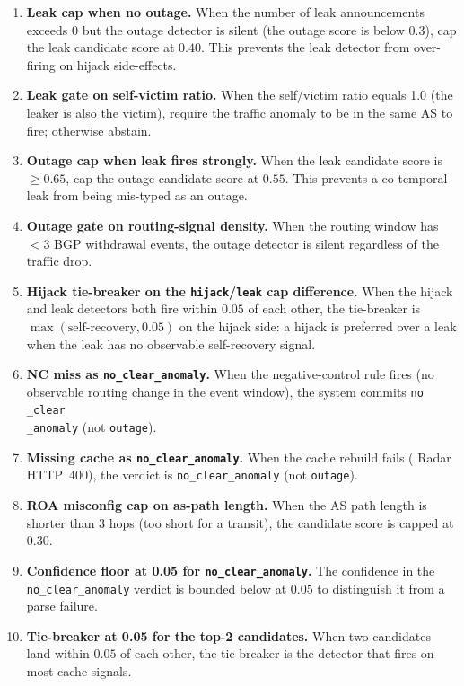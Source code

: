 \documentclass[sigcomm,nonatbib]{acmart}
\begin{document}
\begin{enumerate}
\item \textbf{Leak cap when no outage.} When
the number of leak announcements exceeds 0 but the outage detector is silent
(the outage score is below 0.3), cap the leak candidate
score at $0.40$. This prevents the leak detector
from over-firing on hijack side-effects.
\item \textbf{Leak gate on self-victim ratio.} When
the self/victim ratio equals 1.0 (the leaker
is also the victim), require the traffic anomaly
to be in the same AS to fire;
otherwise abstain.
\item \textbf{Outage cap when leak fires strongly.}
When the leak candidate score is $\geq 0.65$, cap the outage candidate
score at $0.55$. This prevents a co-temporal leak
from being mis-typed as an outage.
\item \textbf{Outage gate on routing-signal density.}
When the routing window has $< 3$ BGP withdrawal
events, the outage detector is silent regardless
of the traffic drop.
\item \textbf{Hijack tie-breaker on the
\texttt{hijack}/\texttt{leak} cap difference.}
When the hijack and leak detectors
both fire within $0.05$ of each other,
the tie-breaker is $\max(\text{self-recovery}, 0.05)$
on the hijack side: a hijack is preferred over
a leak when the leak has no observable
self-recovery signal.
\item \textbf{NC miss as \texttt{no\_clear\_anomaly}.}
When the negative-control rule fires
(no observable routing change in the event window),
the system commits \texttt{no\\_clear\\_anomaly} (not \texttt{outage}).
\item \textbf{Missing cache as \texttt{no\_clear\_anomaly}.}
When the cache rebuild fails
(\cf{} Radar HTTP~400), the verdict is
\texttt{no_clear_anomaly} (not \texttt{outage}).
\item \textbf{ROA misconfig cap on as-path length.}
When the AS path length is shorter than 3 hops (too short for a
transit), the candidate score
is capped at $0.30$.
\item \textbf{Confidence floor at 0.05 for
\texttt{no\_clear\_anomaly}.} The confidence in
the \texttt{no_clear_anomaly} verdict is bounded
below at $0.05$ to distinguish it from a parse
failure.
\item \textbf{Tie-breaker at 0.05 for the
top-2 candidates.} When two candidates land within
$0.05$ of each other, the tie-breaker is the
detector that fires on most cache signals.
\end{enumerate}
\end{document}
